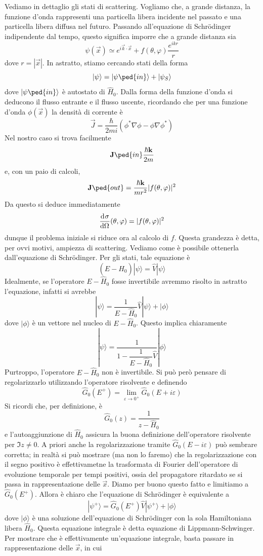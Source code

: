 \documentclass[a4paper, 11pt]{article}
\newcommand{\op}[1]{\hat{#1}}
\renewcommand{\op}[1]{\hat{#1}}
\newcommand{\ham}{\hat{H}}
\renewcommand{\ket}[1]{| #1\rangle}
\begin{document}
Vediamo in dettaglio gli stati di scattering. Vogliamo che, a grande distanza, la funzione d'onda rappresenti una particella libera incidente nel passato e una particella libera diffusa nel futuro. Passando all'equazione di Schr\"odinger indipendente dal tempo, questo significa imporre che a grande distanza sia
\[\psi(\vec{x})\simeq e^{i\vec{k}\cdot\vec{x}}+f(\theta,\varphi)\frac{e^{ikr}}{r}\]
dove $r=|\vec{x}|$. In astratto, stiamo cercando stati della forma
\[\ket{\psi}=\ket{\psi\ped{in}}+\ket{\psi_S}\]
dove $\ket{\psi\ped{in}}$ è autostato di $\ham_0$. Dalla forma della funzione d'onda si deducono il flusso entrante e il flusso uscente, ricordando che per una funzione d'onda $\phi(\vec{x})$ la densità di corrente è
\[\vec{J}=\frac{\hbar}{2mi}\left(\phi^*\nabla\phi-\phi\nabla\phi^*\right)\]
Nel nostro caso si trova facilmente
\[\vec{J}\ped{in}\frac{\hbar\vec{k}}{2m}\]
e, con un paio di calcoli,
\[\vec{J}\ped{out}=\frac{\hbar\vec{k}}{mr^2}|f(\theta,\varphi)|^2\]
Da questo si deduce immediatamente
\[\dfrac{\mathrm{d} ^{}\sigma}{\mathrm{d} {\Omega}^{}}(\theta,\varphi)=|f(\theta,\varphi)|^2\]
dunque il problema iniziale si riduce ora al calcolo di $f$. Questa grandezza è detta, per ovvi motivi, ampiezza di scattering. Vediamo come è possibile ottenerla dall'equazione di Schr\"odinger. Per gli stati, tale equazione è
\[(E-\ham_0)\ket{\psi}=\op V\ket\psi\]
Idealmente, se l'operatore $E-\ham_0$ fosse invertibile avremmo risolto in astratto l'equazione, infatti si avrebbe
\[\ket{\psi}=\frac{1}{E-\ham_0}\op V\ket{\psi}+\ket{\phi}\]
dove $\ket{\phi}$ è un vettore nel nucleo di $E-\ham_0$. Questo implica chiaramente
\[\ket{\psi}=\frac{1}{1-\dfrac{1}{E-\ham_0}\op V}\ket{\phi}\]
Purtroppo, l'operatore $E-\ham_0$ non è invertibile. Si può però pensare di regolarizzarlo utilizzando l'operatore risolvente e definendo
\[\op G_0(E^+)=\lim\limits_{\varepsilon\to0^+}\op G_0(E+i\varepsilon)\]
Si ricordi che, per definizione, è
\[\op G_0(z)=\frac{1}{z-\ham_0}\]
e l'autoaggiunzione di $\ham_0$ assicura la buona definizione dell'operatore risolvente per $\Im z\neq0$.  A priori anche la regolarizzazione tramite $\op G_0(E-i\varepsilon)$ può sembrare corretta; in realtà si può mostrare (ma non lo faremo) che la regolarizzazione con il segno positivo è effettivametne la trasformata di Fourier dell'operatore di evoluzione temporale per tempi positivi, ossia del propagatore ritardato se si passa in rappresentazione delle $\vec x$. Diamo per buono questo fatto e limitiamo a $\op G_0(E^+)$. Allora è chiaro che l'equazione di Schr\"odinger è equivalente a
\[\ket{\psi^+}=\op G_0(E^+)\op V\ket{\psi^+}+\ket{\phi}\]
dove $\ket{\phi}$ è una soluzione dell'equazione di Schr\"odinger con la sola Hamiltoniana libera $\ham_0$. Questa equazione integrale è detta equazione di Lippmann-Schwinger. Per mostrare che è effettivamente un'equazione integrale, basta passare in rappresentazione delle $\vec{x}$, in cui
\end{document}
